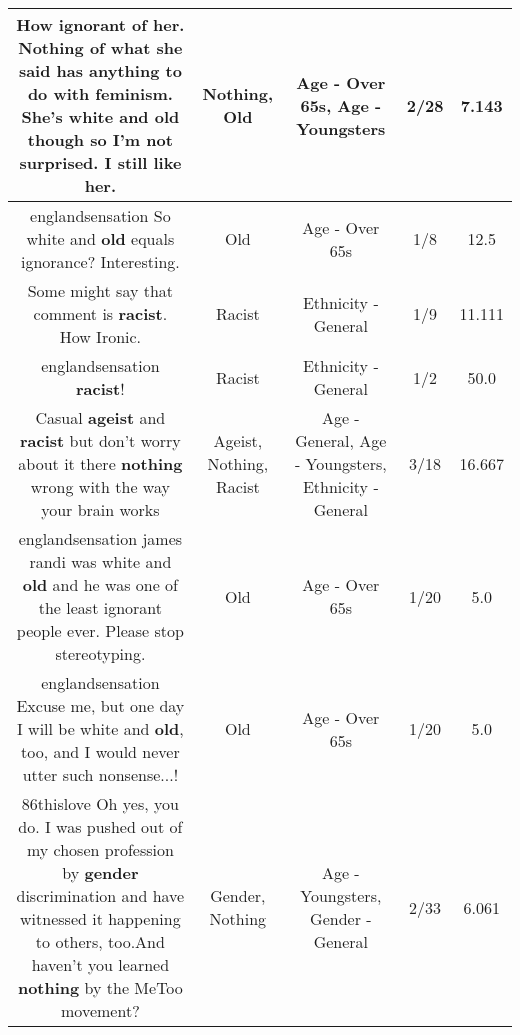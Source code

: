 \documentclass[11pt]{article}
\newlength\mylength
\begin{document}
\begin{center}
\begin{longtable}{|C{.65\mylength}|C{.30\mylength}|C{.12\mylength}|C{.12\mylength}|C{.12\mylength}|}
  \small How ignorant of her. \textbf{Nothing} of what she said has anything to do with feminism. She's white and \textbf{old} though so I'm not surprised. I still like her.\normalsize   & Nothing, Old & Age - Over 65s, Age - Youngsters & 2/28 & 7.143 \\  \hline
  \small englandsensation So white and \textbf{old} equals ignorance? Interesting.\normalsize   & Old & Age - Over 65s & 1/8 & 12.5 \\  \hline
  \small Some might say that comment is \textbf{racist}. How Ironic.\normalsize   & Racist & Ethnicity - General & 1/9 & 11.111 \\  \hline
  \small englandsensation  \textbf{racist}!\normalsize   & Racist & Ethnicity - General & 1/2 & 50.0 \\  \hline
  \small Casual \textbf{ageist} and \textbf{racist} but don't worry about it there \textbf{nothing} wrong with the way your brain works\normalsize   & Ageist, Nothing, Racist & Age - General, Age - Youngsters, Ethnicity - General & 3/18 & 16.667 \\  \hline
  \small englandsensation james randi was white and \textbf{old} and he was one of the least ignorant people ever. Please stop stereotyping.\normalsize   & Old & Age - Over 65s & 1/20 & 5.0 \\  \hline
  \small englandsensation Excuse me, but one day I will be white and \textbf{old}, too, and I would never utter such nonsense...!\normalsize   & Old & Age - Over 65s & 1/20 & 5.0 \\  \hline
  \small 86thislove Oh yes, you do. I was pushed out of my chosen profession by \textbf{gender} discrimination and have witnessed it happening to others, too.And haven't you learned \textbf{nothing} by the MeToo movement?\normalsize   & Gender, Nothing & Age - Youngsters, Gender - General & 2/33 & 6.061 \\  \hline

\end{longtable}
\end{center}
\end{document}
